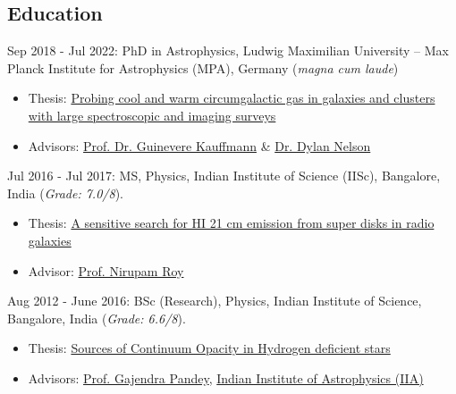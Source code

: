 \documentclass[12pt,letterpaper]{article}
\begin{document}
\subsection{Education}
\begin{list}{}{\cvlist}
  \item Sep 2018 - Jul 2022: PhD in Astrophysics, Ludwig Maximilian University -- Max Planck Institute for Astrophysics (MPA), Germany (\emph{magna cum laude})
\begin{itemize}
    \item Thesis: \href{https://edoc.ub.uni-muenchen.de/30337/}{Probing cool and warm circumgalactic gas in galaxies and clusters with large spectroscopic and imaging surveys}
    \item Advisors: \href{https://www.mpa-garching.mpg.de/galaxyformation}{Prof. Dr. Guinevere Kauffmann} \& \href{https://www.ita.uni-heidelberg.de/~dnelson/}{Dr. Dylan Nelson}
\end{itemize}

\item Jul 2016 - Jul 2017: MS, Physics, Indian Institute of Science (IISc), Bangalore, India (\emph{Grade: 7.0/8}).
\begin{itemize}
    \item Thesis: \href{https://raw.githubusercontent.com/abhi0395/mycv/main/files/MS_thesis.pdf}{A sensitive search for HI 21 cm emission from super disks in radio galaxies}
      \vspace{-1mm}
    \item Advisor: \href{http://www.physics.iisc.ernet.in/%7Enroy/}{Prof. Nirupam Roy}
  \end{itemize}
\item Aug 2012 - June 2016: BSc (Research), Physics, Indian Institute of Science, Bangalore, India (\emph{Grade: 6.6/8}).
\begin{itemize}
    \item Thesis: \href{https://raw.githubusercontent.com/abhi0395/mycv/main/files/BS_thesis.pdf}{Sources of Continuum Opacity in Hydrogen deficient stars}
      \vspace{-1mm}
    \item Advisors: \href{https://www.iiap.res.in/?q=user/29}{Prof. Gajendra Pandey}, \href{https://www.iiap.res.in/}{Indian Institute of Astrophysics (IIA)}
  \end{itemize}
\end{list}

\vspace{-1.5mm}
\end{document}
